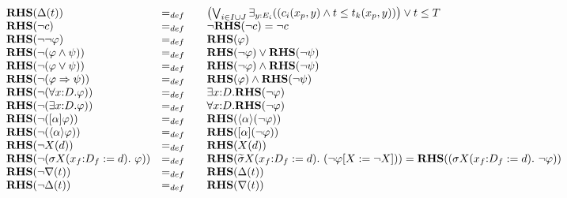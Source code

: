 \documentclass{article}
\begin{document}
\begin{equation*}
\begin{array}{lll}
{\mathbf{RHS}}(\Delta (t)) & =_{def} & \left( \bigvee_{i{\in }I\cup
J}\exists _{y{:}E_{i}}((c_{i}(x_{p},y)\wedge t\leq t_{k}(x_{p},y))\right)
\vee t\leq T \\ 
{\mathbf{RHS}}(\lnot c) & =_{def} & \lnot {\mathbf{RHS}}(\lnot c)=\lnot c \\ 
{\mathbf{RHS}}(\lnot \lnot \varphi ) & =_{def} & \mathbf{RHS}(\varphi ) \\ 
{\mathbf{RHS}}(\lnot (\varphi \wedge \psi )) & =_{def} & {\mathbf{RHS}}%
(\lnot \varphi )\vee {\mathbf{RHS}}(\lnot \psi ) \\ 
{\mathbf{RHS}}(\lnot (\varphi \vee \psi )) & =_{def} & {\mathbf{RHS}}(\lnot
\varphi )\wedge {\mathbf{RHS}}(\lnot \psi ) \\ 
{\mathbf{RHS}}(\lnot (\varphi \Rightarrow \psi )) & =_{def} & {\mathbf{RHS}}%
(\varphi )\wedge {\mathbf{RHS}}(\lnot \psi ) \\ 
{\mathbf{RHS}}(\lnot (\forall {x{:}D}.\varphi )) & =_{def} & \exists {x{:}D}.%
{\mathbf{RHS}}(\lnot \varphi ) \\ 
{\mathbf{RHS}}(\lnot (\exists {x{:}D}.\varphi )) & =_{def} & \forall {x{:}D}.%
{\mathbf{RHS}}(\lnot \varphi ) \\ 
{\mathbf{RHS}}(\lnot ([\alpha ]\varphi )) & =_{def} & {\mathbf{RHS}}(\langle
\alpha \rangle (\lnot \varphi )) \\ 
{\mathbf{RHS}}(\lnot (\langle \alpha \rangle \varphi )) & =_{def} & {\mathbf{%
RHS}}([\alpha ](\lnot \varphi )) \\ 
{\mathbf{RHS}}(\lnot X(d)) & =_{def} & {\mathbf{RHS}}(X(d)) \\ 
{\mathbf{RHS}}(\lnot (\sigma X(x_{f}{:}D_{f}:=d).~\varphi )) & =_{def}~~~ & {%
\mathbf{RHS}}(\widetilde{\sigma }X(x_{f}{:}D_{f}:=d).~(\lnot \varphi \lbrack
X:=\lnot X]))={\mathbf{RHS}}((\sigma X(x_{f}{:}D_{f}:=d).~\lnot \varphi ))
\\ 
{\mathbf{RHS}}(\lnot \nabla (t)) & =_{def} & {\mathbf{RHS}}(\Delta (t)) \\ 
{\mathbf{RHS}}(\lnot \Delta (t)) & =_{def} & {\mathbf{RHS}}(\nabla (t))%
\end{array}%
\end{equation*}

\pagebreak
\end{document}
